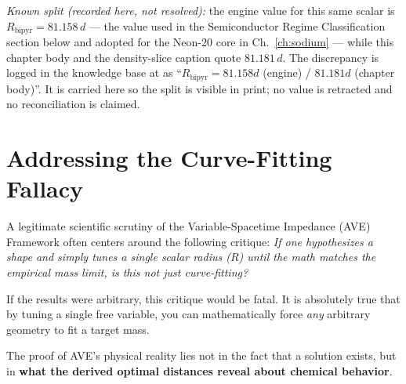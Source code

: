 \noindent\emph{Known split (recorded here, not resolved):} the engine value for this same scalar is $R_{\text{bipyr}} = 81.158\,d$ --- the value used in the Semiconductor Regime Classification section below and adopted for the Neon-20 core in Ch.~\ref{ch:sodium} --- while this chapter body and the density-slice caption quote $81.181\,d$. The discrepancy is logged in the knowledge base at  as ``$R_{\text{bipyr}} = 81.158d$ (engine) / $81.181d$ (chapter body)''. It is carried here so the split is visible in print; no value is retracted and no reconciliation is claimed.

\section{Addressing the Curve-Fitting Fallacy}
A legitimate scientific scrutiny of the Variable-Spacetime Impedance (AVE) Framework often centers around the following critique: \textit{If one hypothesizes a shape and simply tunes a single scalar radius ($R$) until the math matches the empirical mass limit, is this not just curve-fitting?}

If the results were arbitrary, this critique would be fatal. It is absolutely true that by tuning a single free variable, you can mathematically force \textit{any} arbitrary geometry to fit a target mass.

The proof of AVE's physical reality lies not in the fact that a solution exists, but in \textbf{what the derived optimal distances reveal about chemical behavior}.

